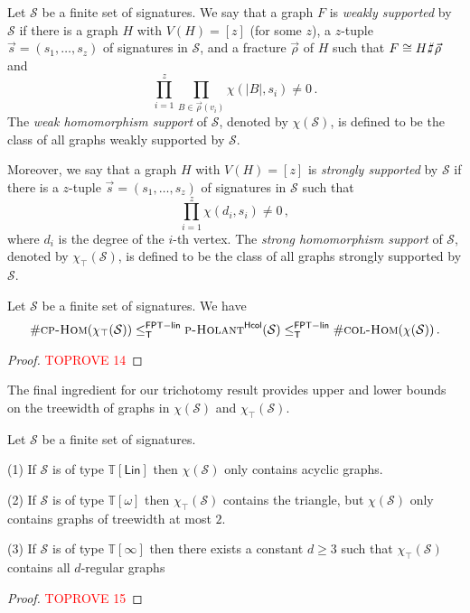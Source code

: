 \documentclass[authorcolumns,numberwithinsect]{no-lipics-v2022}
\newcommand{\homsupp}{\chi}
\newcommand{\cphomsprob}{\text{\sc{cp-Hom}}}
\newcommand{\colhomsprob}{\text{\sc{col-Hom}}}
\newcommand{\fptlinred}{\leq^{\mathsf{FPT-lin}}_{\mathsf{T}}}
\def\fracture#1#2{\ensuremath{#1\raisebox{.2ex}{\rotatebox[origin=c]{-15}{$\sharp$}}#2}}
\newcommand{\holantprobstar}{\text{\sc{p-Holant}}^{\mathsf{Hcol}}}
\def\fracture#1#2{\ensuremath{#1\raisebox{.2ex}{\rotatebox[origin=c]{-15}{$\sharp$}}#2}}
\begin{document}
\begin{definition}[Homomorphism Supports $\homsupp(\mathcal{S})$ and $\homsupp_\top(\mathcal{S})$]
    Let $\mathcal{S}$ be a finite set of signatures. We say that a graph $F$ is \emph{weakly supported} by $\mathcal{S}$ if there is a graph $H$ with $V(H)=[z]$ (for some $z$), a $z$-tuple $\vec{s}=(s_1,\dots,s_z)$ of signatures in $\mathcal{S}$, and a fracture $\vec{\rho}$ of $H$ such that
    $F \cong \fracture{H}{\vec{\rho}}$ and
        \[\prod_{i=1}^z \prod_{B\in \vec{\rho}(v_i)} \chi(|B|,s_i)\neq 0\,.\]
The \emph{weak homomorphism support} of $\mathcal{S}$, denoted by $\homsupp(\mathcal{S})$, is defined to be the class of all graphs weakly supported by $\mathcal{S}$. 
        
Moreover, we say that a graph $H$ with $V(H)=[z]$  is \emph{strongly supported} by $\mathcal{S}$ if there is a $z$-tuple $\vec{s}=(s_1,\dots,s_z)$ of signatures in $\mathcal{S}$ such that 
    \[  \prod_{i=1}^z \chi(d_i,s_i) \neq 0\,,\]
    where $d_i$ is the degree of the $i$-th vertex. The \emph{strong homomorphism support} of $\mathcal{S}$, denoted by $\homsupp_\top(\mathcal{S})$, is defined to be the class of all graphs strongly supported by $\mathcal{S}$. 
\end{definition}


\begin{lemma}\label{lem:holant_sandwich}
    Let $\mathcal{S}$ be a finite set of signatures. We have
    \[\#\cphomsprob(\homsupp_\top(\mathcal{S})) \fptlinred \holantprobstar(\mathcal{S}) \fptlinred \#\colhomsprob(\homsupp(\mathcal{S})) \,.\]
\end{lemma}
\begin{proof}\textcolor{red}{TOPROVE 14}\end{proof}

The final ingredient for our trichotomy result provides upper and lower bounds on the treewidth of graphs in $\homsupp(\mathcal{S})$ and $\homsupp_\top(\mathcal{S})$.

\begin{lemma}\label{lem:hom_support_characterisation}
    Let $\mathcal{S}$ be a finite set of signatures. 
    \item[(1)] If $\mathcal{S}$ is of type $\mathbb{T}[\mathsf{Lin}]$ then $\homsupp(\mathcal{S})$ only contains acyclic graphs.
    \item[(2)] If $\mathcal{S}$ is of type $\mathbb{T}[\omega]$ then $\homsupp_\top(\mathcal{S})$ contains the triangle, but $\homsupp(\mathcal{S})$ only contains graphs of treewidth at most $2$.
    \item[(3)] If $\mathcal{S}$ is of type $\mathbb{T}[\infty]$ then there exists a constant $d\geq 3$ such that $\homsupp_\top(\mathcal{S})$ contains all $d$-regular graphs
\end{lemma}
\begin{proof}\textcolor{red}{TOPROVE 15}\end{proof}
\end{document}
